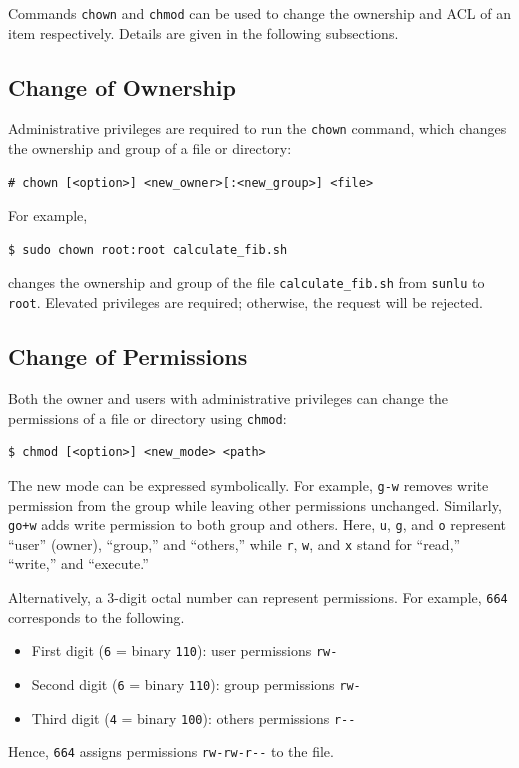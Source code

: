 Commands \verb|chown| and \verb|chmod| can be used to change the ownership and ACL of an item respectively. Details are given in the following subsections.

\subsection{Change of Ownership} \label{sec:chown}

Administrative privileges are required to run the \verb|chown| command, which changes the ownership and group of a file or directory:
\begin{lstlisting}
# chown [<option>] <new_owner>[:<new_group>] <file>
\end{lstlisting}

For example,
\begin{lstlisting}
$ sudo chown root:root calculate_fib.sh
\end{lstlisting}
changes the ownership and group of the file \verb|calculate_fib.sh| from \verb|sunlu| to \verb|root|. Elevated privileges are required; otherwise, the request will be rejected.

\subsection{Change of Permissions} \label{sec:chmod}

Both the owner and users with administrative privileges can change the permissions of a file or directory using \verb|chmod|:
\begin{lstlisting}
$ chmod [<option>] <new_mode> <path>
\end{lstlisting}

The new mode can be expressed symbolically. For example, \verb|g-w| removes write permission from the group while leaving other permissions unchanged. Similarly, \verb|go+w| adds write permission to both group and others. Here, \verb|u|, \verb|g|, and \verb|o| represent ``user'' (owner), ``group,'' and ``others,'' while \verb|r|, \verb|w|, and \verb|x| stand for ``read,'' ``write,'' and ``execute.''

Alternatively, a $3$-digit octal number can represent permissions. For example, \verb|664| corresponds to the following.
\begin{itemize}
  \item First digit (\verb|6| = binary \verb|110|): user permissions \verb|rw-|
  \item Second digit (\verb|6| = binary \verb|110|): group permissions \verb|rw-|
  \item Third digit (\verb|4| = binary \verb|100|): others permissions \verb|r--|
\end{itemize}
Hence, \verb|664| assigns permissions \verb|rw-rw-r--| to the file.


